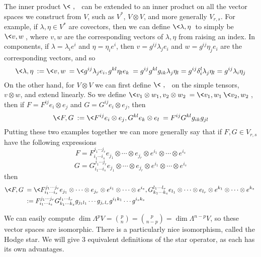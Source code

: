 The inner product $\<\ ,\ \>$ can be extended to an inner product on all the vector spaces we construct from $V$, such as $V^*$, $V \otimes V$, and more generally $V_{r,s}$. For example, if $\lambda,\eta \in V^*$ are covectors, then we can define $\<\lambda,\eta\>$ to simply be $\<v,w\>$, where $v,w$ are the corresponding vectors of $\lambda,\eta$ from raising an index. In components, if $\lambda = \lambda_i e^i$ and $\eta = \eta_i e^i$, then $v = g^{ij} \lambda_j e_i$ and $w = g^{ij} \eta_j e_i$ are the corresponding vectors, and so
\[ \< \lambda,\eta \> := \< v,w \> = \< g^{ij} \lambda_j e_i, g^{kl} \eta_l e_k \> = g^{ij} g^{kl} g_{ik} \lambda_j \eta_l = g^{ij} \delta_i^l \lambda_j \eta_l = g^{ij} \lambda_i \eta_j \]
On the other hand, for $V \otimes V$ we can first define $\<\ ,\ \>$ on the simple tensors, $v \otimes w$, and extend linearly. So we define $\< v_1 \otimes w_1, v_2 \otimes w_2 \> = \<v_1,w_1\>\<v_2,w_2\>$, then if $F = F^{ij} e_i \otimes e_j$ and $G = G^{ij} e_i \otimes e_j$, then 
\[ \< F,G \> := \< F^{ij} e_i \otimes e_j, G^{kl} e_k \otimes e_l \> = F^{ij} G^{kl} g_{ik} g_{jl} \]
Putting these two examples together we can more generally say that if $F,G \in V_{r,s}$ have the following expressions
\[ F = F_{i_1 \cdots i_s}^{j_1 \cdots j_r} e_{j_1} \otimes \cdots \otimes e_{j_r} \otimes e^{i_1} \otimes \cdots \otimes e^{i_s} \]
\[ G = G_{i_1 \cdots i_s}^{j_1 \cdots j_r} e_{j_1} \otimes \cdots \otimes e_{j_r} \otimes e^{i_1} \otimes \cdots \otimes e^{i_s} \]
then
\begin{align*}
	\< F,G \> &= \< F_{i_1 \cdots i_s}^{j_1 \cdots j_r} e_{j_1} \otimes \cdots \otimes e_{j_r} \otimes e^{i_1} \otimes \cdots \otimes e^{i_s}, G_{k_1 \cdots k_s}^{l_1 \cdots l_r} e_{l_1} \otimes \cdots \otimes e_{l_r} \otimes e^{k_1} \otimes \cdots \otimes e^{k_s} \> \\
	          &:= F_{i_1 \cdots i_s}^{j_1 \cdots j_r} G_{k_1 \cdots k_s}^{l_1 \cdots l_r} g_{j_1l_1} \cdots g_{j_rl_r} g^{i_1k_1} \cdots g^{i_sk_s}
\end{align*}





We can easily compute $\dim \Lambda^p V = \binom{p}{n} = \binom{p}{n-p} = \dim \Lambda^{n-p} V$, so these vector spaces are isomorphic. There is a particularly nice isomorphism, called the Hodge star. We will give 3 equivalent definitions of the star operator, as each has its own advantages.

